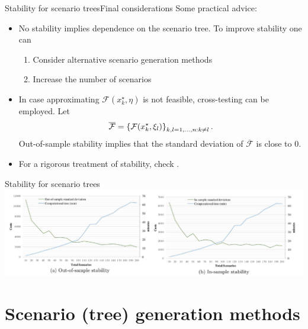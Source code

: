 \begin{frame}{Stability for scenario trees}{Final considerations}
	Some practical advice:
	\begin{itemize}
		\item No stability implies \alert{dependence} on the scenario tree. To improve stability one can
		\begin{enumerate}
			\item Consider alternative scenario generation methods
			\item Increase the number of scenarios	
		\end{enumerate}
		\item In case approximating $\mathcal{F}(x_k^\star, \eta)$ is not feasible, cross-testing can be employed. Let 
		$$
			\overline{\mathcal{F}} = \left\{ \mathcal{F}(x_k^\star, \xi_l) \right \}_{k,l = 1,\dots, n : k \neq l}.
		$$
		Out-of-sample stability implies that the standard deviation of $\overline{\mathcal{F}}$ is close to 0.
		\item For a rigorous treatment of stability, check {\small \cite{dupavcova1990stability, schultz2000some, heitsch2006stability}}.
	\end{itemize}
\end{frame}

\begin{frame}{Stability for scenario trees {\small \cite{dillon2017two}}}
	\centering
	\includegraphics[width=1\textwidth]{figures/scen_stability.pdf}
	
\end{frame}



\section{Scenario (tree) generation methods}



